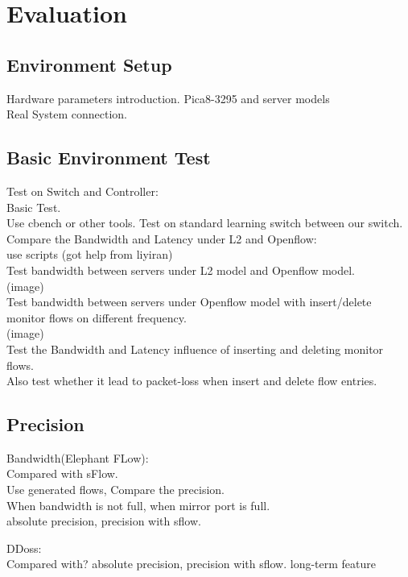 \documentclass{acm_proc_article-sp}
\begin{document}
\section{Evaluation}

\subsection{Environment Setup}
Hardware parameters introduction. Pica8-3295 and server models\\
Real System connection.\\

\subsection{Basic Environment Test}
Test on Switch and Controller:\\
Basic Test.\\
Use cbench or other tools. Test on standard learning switch between our switch.\\

Compare the Bandwidth and Latency under L2 and Openflow:\\
use scripts (got help from liyiran)\\
Test bandwidth between servers under L2 model and Openflow model.\\
(image)\\
Test bandwidth between servers under Openflow model with insert/delete monitor flows on different frequency.\\
(image)\\

Test the Bandwidth and Latency influence of inserting and deleting monitor flows.\\
Also test whether it lead to packet-loss when insert and delete flow entries.\\

\subsection{Precision}
Bandwidth(Elephant FLow):\\
Compared with sFlow.\\
Use generated flows, Compare the precision.\\
When bandwidth is not full, when mirror port is full.\\
absolute precision, precision with sflow.

DDoss:\\
Compared with?
absolute precision, precision with sflow.
long-term feature
\end{document}
